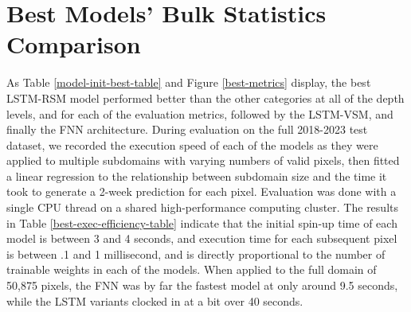%
%
%
%


\section{Best Models' Bulk Statistics Comparison}

As Table \ref{model-init-best-table} and Figure \ref{best-metrics} display, the best LSTM-RSM model performed better than the other categories at all of the depth levels, and for each of the evaluation metrics, followed by the LSTM-VSM, and finally the FNN architecture. During evaluation on the full 2018-2023 test dataset, we recorded the execution speed of each of the models as they were applied to multiple subdomains with varying numbers of valid pixels, then fitted a linear regression to the relationship between subdomain size and the time it took to generate a 2-week prediction for each pixel. Evaluation was done with a single CPU thread on a shared high-performance computing cluster. The results in Table \ref{best-exec-efficiency-table} indicate that the initial spin-up time of each model is between 3 and 4 seconds, and execution time for each subsequent pixel is between .1 and 1 millisecond, and is directly proportional to the number of trainable weights in each of the models. When applied to the full domain of 50,875 pixels, the FNN was by far the fastest model at only around 9.5 seconds, while the LSTM variants clocked in at a bit over 40 seconds.

